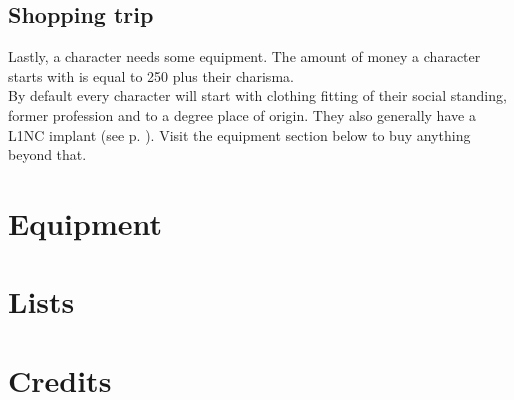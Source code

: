 \documentclass[12pt,a4paper,openany,dvipsnames]{book}
\begin{document}
	\section{Shopping trip}
	Lastly, a character needs some equipment. The amount of money a character starts with is equal to 250 plus their charisma. \\
	By default every character will start with clothing fitting of their social standing, former profession and to a degree place of origin.
	They also generally have a L1NC implant (see p. \pageref{implant:l1nc}).
	Visit the equipment section below to buy anything beyond that.

	\chapter{Equipment}
	
	
	
	
	
	

	
	

	\chapter{Lists}
	
	
	

	
	
	\newpage
	
	

	

	
	
	

	\chapter{Credits}
	
\end{document}
